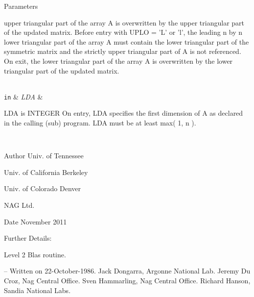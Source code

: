 \begin{DoxyParams}[1]{Parameters}
\begin{DoxyVerb}
           upper triangular part of the array A is overwritten by the
           upper triangular part of the updated matrix.
           Before entry with UPLO = 'L' or 'l', the leading n by n
           lower triangular part of the array A must contain the lower
           triangular part of the symmetric matrix and the strictly
           upper triangular part of A is not referenced. On exit, the
           lower triangular part of the array A is overwritten by the
           lower triangular part of the updated matrix.\end{DoxyVerb}
\\
\hline
\mbox{\tt in}  & {\em L\+D\+A} & \begin{DoxyVerb}          LDA is INTEGER
           On entry, LDA specifies the first dimension of A as declared
           in the calling (sub) program. LDA must be at least
           max( 1, n ).\end{DoxyVerb}
 \\
\hline
\end{DoxyParams}
\begin{DoxyAuthor}{Author}
Univ. of Tennessee 

Univ. of California Berkeley 

Univ. of Colorado Denver 

N\+A\+G Ltd. 
\end{DoxyAuthor}
\begin{DoxyDate}{Date}
November 2011 
\end{DoxyDate}
\begin{DoxyParagraph}{Further Details\+: }
\begin{DoxyVerb}  Level 2 Blas routine.

  -- Written on 22-October-1986.
     Jack Dongarra, Argonne National Lab.
     Jeremy Du Croz, Nag Central Office.
     Sven Hammarling, Nag Central Office.
     Richard Hanson, Sandia National Labs.\end{DoxyVerb}
 
\end{DoxyParagraph}
\hypertarget{group__single__blas__level2_gab1000098b0929f8256ced0ab89141b31}{}
